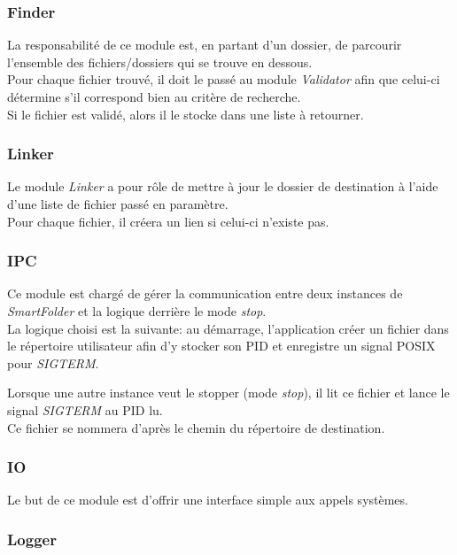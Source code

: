 \documentclass[11pt, a4paper]{article}
\begin{document}
\subsubsection{Finder}
La responsabilité de ce module est, en partant d'un dossier,
de parcourir l'ensemble des fichiers/dossiers qui se trouve en dessous. \\

Pour chaque fichier trouvé, il doit le passé au module \textit{Validator} afin que
celui-ci détermine s'il correspond bien au critère de recherche. \\

Si le fichier est validé, alors il le stocke dans une liste à retourner.

\subsubsection{Linker}
Le module \textit{Linker} a pour rôle de mettre à jour le dossier de destination
à l'aide d'une liste de fichier passé en paramètre. \\

Pour chaque fichier, il créera un lien si celui-ci n'existe pas.

\subsubsection{IPC}
\label{sec:ipc}
Ce module est chargé de gérer la communication entre deux instances de \textit{SmartFolder}
et la logique derrière le mode \textit{stop}. \\

La logique choisi est la suivante: au démarrage, l'application créer un fichier dans le répertoire utilisateur
afin d'y stocker son PID et enregistre un signal POSIX pour \textit{SIGTERM}.

Lorsque une autre instance veut le stopper (mode \textit{stop}), il lit ce fichier
et lance le signal \textit{SIGTERM} au PID lu. \\

Ce fichier se nommera d'après le chemin du répertoire de destination.

\subsubsection{IO}
Le but de ce module est d'offrir une interface simple aux appels systèmes.

\subsubsection{Logger}
\end{document}
